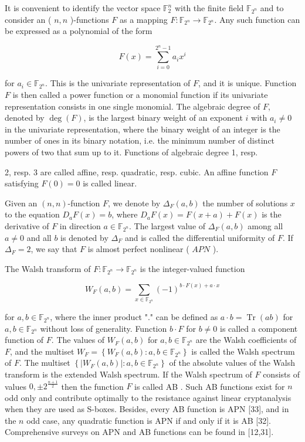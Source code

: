 \documentclass[10pt]{article}
\begin{document}
It is convenient to identify the vector space $\mathbb{F}_{2}^{n}$ with the finite field $\mathbb{F}_{2^{n}}$ and to consider an ( $n, n$ )-functions $F$ as a mapping $F: \mathbb{F}_{2^{n}} \rightarrow \mathbb{F}_{2^{n}}$. Any such function can be expressed as a polynomial of the form

$$
F(x)=\sum_{i=0}^{2^{n}-1} a_{i} x^{i}
$$

for $a_{i} \in \mathbb{F}_{2^{n}}$. This is the univariate representation of $F$, and it is unique. Function $F$ is then called a power function or a monomial function if its univariate representation consists in one single monomial. The algebraic degree of $F$, denoted by $\operatorname{deg}(F)$, is the largest binary weight of an exponent $i$ with $a_{i} \neq 0$ in the univariate representation, where the binary weight of an integer is the number of ones in its binary notation, i.e. the minimum number of distinct powers of two that sum up to it. Functions of algebraic degree 1, resp.

2, resp. 3 are called affine, resp. quadratic, resp. cubic. An affine function $F$ satisfying $F(0)=0$ is called linear.

Given an $(n, n)$-function $F$, we denote by $\Delta_{F}(a, b)$ the number of solutions $x$ to the equation $D_{a} F(x)=b$, where $D_{a} F(x)=F(x+a)+F(x)$ is the derivative of $F$ in direction $a \in \mathbb{F}_{2^{n}}$. The largest value of $\Delta_{F}(a, b)$ among all $a \neq 0$ and all $b$ is denoted by $\Delta_{F}$ and is called the differential uniformity of $F$. If $\Delta_{F}=2$, we say that $F$ is almost perfect nonlinear ( $A P N$ ).

The Walsh transform of $F: \mathbb{F}_{2^{n}} \rightarrow \mathbb{F}_{2^{n}}$ is the integer-valued function

$$
W_{F}(a, b)=\sum_{x \in \mathbb{F}_{2^{n}}}(-1)^{b \cdot F(x)+a \cdot x}
$$

for $a, b \in \mathbb{F}_{2^{n}}$, where the inner product "." can be defined as $a \cdot b=\operatorname{Tr}(a b)$ for $a, b \in \mathbb{F}_{2^{n}}$ without loss of generality. Function $b \cdot F$ for $b \neq 0$ is called a component function of $F$. The values of $W_{F}(a, b)$ for $a, b \in \mathbb{F}_{2^{n}}$ are the Walsh coefficients of $F$, and the multiset $W_{F}=\left\{W_{F}(a, b): a, b \in \mathbb{F}_{2^{n}}\right\}$ is called the Walsh spectrum of $F$. The multiset $\left\{\left|W_{F}(a, b)\right|: a, b \in \mathbb{F}_{2^{n}}\right\}$ of the absolute values of the Walsh transform is the extended Walsh spectrum. If the Walsh spectrum of $F$ consists of values $0, \pm 2^{\frac{n+1}{2}}$ then the function $F$ is called AB . Such AB functions exist for $n$ odd only and contribute optimally to the resistance against linear cryptanalysis when they are used as S-boxes. Besides, every AB function is APN [33], and in the $n$ odd case, any quadratic function is APN if and only if it is AB [32]. Comprehensive surveys on APN and AB functions can be found in [12,31].
\end{document}
